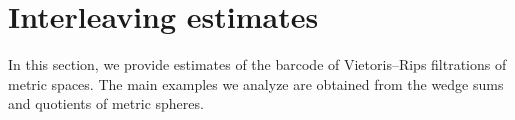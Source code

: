 
\section{Interleaving estimates}\label{s:barcodes}

In this section, we provide estimates of the barcode of Vietoris--Rips filtrations of metric spaces.
The main examples we analyze are obtained from the wedge sums and quotients of metric spheres.




